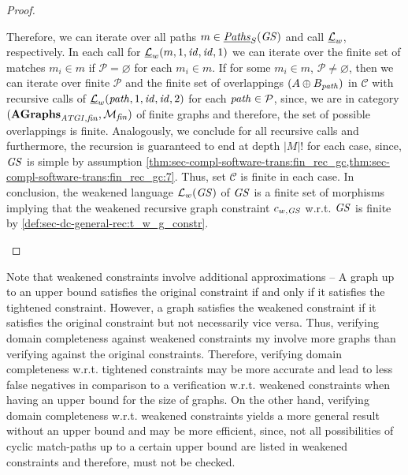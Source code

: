 \begin{proof}
\begin{enumerate}
  Therefore, we can iterate over all paths $m \in \underline{\mathit{Paths}}_S(\mathit{GS})$ and call $\underline{\mathcal{L}}_w$, respectively.
  In each call for $\underline{\mathcal{L}}_w(m,1,\mathit{id},\mathit{id},1)$ we can iterate over the finite set of matches $m_i \in m$ if $\mathcal{P}=\varnothing$ for each $m_i \in m$.
  If for some $m_i \in m$, $\mathcal{P} \neq \varnothing$, then we can iterate over finite $\mathcal{P}$ and the finite set of overlappings $(A \oplus B_\mathit{path})$ in $\mathcal{C}$ with recursive calls of $\underline{\mathcal{L}}_w(\mathit{path},1,\mathit{id},\mathit{id},2)$ for each $\mathit{path} \in \mathcal{P}$, since, we are in category $(\mathbf{AGraphs}_{\mathit{ATGI},\mathit{fin}},{\cal M}_\mathit{fin})$ of finite graphs and therefore, the set of possible overlappings is finite.
  Analogously, we conclude for all recursive calls and furthermore, the recursion is guaranteed to end at depth $|M|!$ for each case, since, $\mathit{GS}$ is simple by assumption \cref{thm:sec-compl-software-trans:fin_rec_gc,thm:sec-compl-software-trans:fin_rec_gc:7}.
  Thus, set $\mathcal{C}$ is finite in each case.
  In conclusion, the weakened language $\mathcal{L}_w(\mathit{GS})$ of $\mathit{GS}$ is a finite set of morphisms implying that the weakened recursive graph constraint $c_{w,\mathit{GS}}$ w.r.t. $\mathit{GS}$ is finite by \cref{def:sec-dc-general-rec:t_w_g_constr}.
\end{enumerate}
\end{proof}

Note that weakened constraints involve additional approximations -- A graph up to an upper bound satisfies the original constraint if and only if it satisfies the tightened constraint. However, a graph satisfies the weakened constraint if it satisfies the original constraint but not necessarily vice versa.
Thus, verifying domain completeness against weakened constraints my involve more graphs than verifying against the original constraints.
Therefore, verifying domain completeness w.r.t. tightened constraints may be more accurate and lead to less false negatives in comparison to a verification w.r.t. weakened constraints when having an upper bound for the size of graphs.
On the other hand, verifying domain completeness w.r.t. weakened constraints yields a more general result without an upper bound and may be more efficient, since, not all possibilities of cyclic match-paths up to a certain upper bound are listed in weakened constraints and therefore, must not be checked.